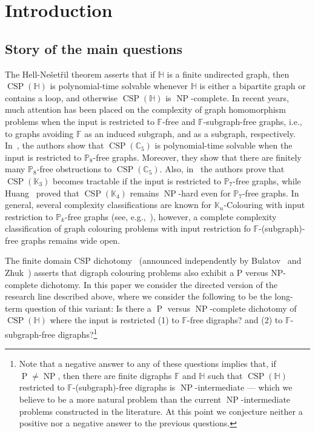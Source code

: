 \documentclass{article}
\theoremstyle{definition}
\theoremstyle{remark}
\DeclareMathOperator{\NP}{NP}
\DeclareMathOperator{\cP}{P}
\DeclareMathOperator{\CSP}{CSP}
\newcommand{\bC}{{\mathbb C}}
\newcommand{\bF}{{\mathbb F}}
\newcommand{\bH}{{\mathbb H}}
\newcommand{\bK}{{\mathbb K}}
\newcommand{\bP}{{\mathbb P}}
\newcommand{\COL}[1]{{\sc ${#1}$-Colouring}}
\begin{document}
\section{Introduction}

\subsection*{Story of the main questions}

The Hell-Ne\v{s}et\v{r}il theorem asserts that if $\bH$ is a finite undirected graph,
then $\CSP(\bH)$ is polynomial-time solvable whenever $\bH$ is either a bipartite graph
or contains a loop, and otherwise $\CSP(\bH)$  is $\NP$-complete.
In recent years, much attention has been placed on the complexity of graph homomorphism
problems when the input is restricted to $\bF$-free and $\bF$-subgraph-free graphs, i.e., to graphs
avoiding $\bF$ as an induced subgraph, and as a subgraph, respectively.
In~\cite{goedgebeurDagstuhl2024}, the authors show that $\CSP(\bC_5)$ is polynomial-time solvable when
the input is restricted to $\bP_8$-free graphs. Moreover, they show that there are finitely many 
$\bP_8$-free obstructions to $\CSP(\bC_5)$. Also, in~\cite{bonomoC38} the authors prove that
$\CSP(\bK_3)$ becomes tractable if the input is restricted to $\bP_7$-free graphs, while Huang~\cite{huangEJC51}
proved that $\CSP(\bK_4)$ remains $\NP$-hard even for $\bP_7$-free graphs. In general, several complexity
classifications are known for \COL{\bK_n} with input restriction to $\bP_k$-free graphs
(see, e.g.,~\cite[Theorem 7]{GJPS17}), however, a complete complexity classification
of graph colouring problems with input restriction fo $\bF$-(subgraph)-free graphs remains
wide open.

The finite domain CSP dichotomy~\cite{Zhuk20} (announced independently by
Bulatov~\cite{BulatovFVConjecture} and Zhuk~\cite{ZhukFVConjecture}) asserts
that digraph colouring problems also exhibit a P versus NP-complete dichotomy.
In this paper we consider the directed version of the research line
described above, where we consider the following to be the long-term question of this variant:
Is there a $\cP$ versus $\NP$-complete dichotomy of $\CSP(\bH)$ where the input
is restricted (1) to $\bF$-free digraphs? and (2) to $\bF$-subgraph-free digraphs?\footnote{Note that a negative answer to any of these questions implies that, if
$\cP\neq \NP$, then there are finite digraphs $\bF$ and $\bH$ such that $\CSP(\bH)$
restricted to $\bF$-(subgraph)-free digraphs is $\NP$-intermediate --- which we believe to
be a more natural problem than the current $\NP$-intermediate problems
constructed in the literature. At this point we conjecture neither a positive nor a negative answer to the previous questions.}
\end{document}
